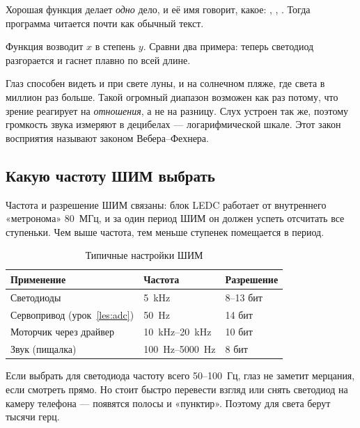 \begin{tip}
Хорошая функция делает \emph{одно} дело, и её имя говорит, какое: , ,
. Тогда программа читается почти как обычный текст.
\end{tip}


Функция  возводит $x$ в степень $y$. Сравни два примера: теперь светодиод
разгорается и гаснет плавно по всей длине.

\begin{fact}
Глаз способен видеть и при свете луны, и на солнечном пляже, где света в миллион раз больше. Такой
огромный диапазон возможен как раз потому, что зрение реагирует на \emph{отношения}, а не на разницу.
Слух устроен так же, поэтому громкость звука измеряют в децибелах --- логарифмической шкале.
Этот закон восприятия называют законом Вебера--Фехнера.
\end{fact}

\subsection{Какую частоту ШИМ выбрать}

Частота и разрешение ШИМ связаны: блок LEDC работает от внутреннего «метронома» 80~МГц, и за один
период ШИМ он должен успеть отсчитать все ступеньки. Чем выше частота, тем меньше ступенек помещается
в период.

\begin{table}[H]
\centering\small
\begin{tabular}{@{}lll@{}}
\toprule
Применение & Частота & Разрешение \\
\midrule
Светодиоды & \SI{5}{kHz} & 8--13 бит \\
Сервопривод (урок~\ref{les:adc}) & \SI{50}{Hz} & 14 бит \\
Моторчик через драйвер & \SIrange{10}{20}{kHz} & 10 бит \\
Звук (пищалка) & \SIrange{100}{5000}{Hz} & 8 бит \\
\bottomrule
\end{tabular}
\caption{Типичные настройки ШИМ}
\end{table}

\begin{tip}
Если выбрать для светодиода частоту всего 50--100~Гц, глаз не заметит мерцания, если смотреть прямо.
Но стоит быстро перевести взгляд или снять светодиод на камеру телефона --- появятся полосы и «пунктир».
Поэтому для света берут тысячи герц.
\end{tip}

